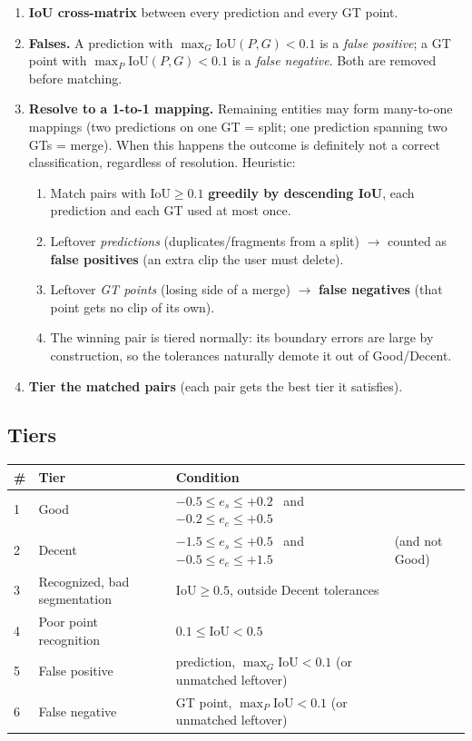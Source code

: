 \documentclass[11pt]{article}
\newcommand{\iou}{\mathrm{IoU}}
\begin{document}
\begin{enumerate}[nosep]
  \item \textbf{IoU cross-matrix} between every prediction and every GT point.
  \item \textbf{Falses.} A prediction with $\max_G \iou(P,G) < 0.1$ is a
        \emph{false positive}; a GT point with $\max_P \iou(P,G) < 0.1$ is a
        \emph{false negative}. Both are removed before matching.
  \item \textbf{Resolve to a 1-to-1 mapping.} Remaining entities may form many-to-one
        mappings (two predictions on one GT = split; one prediction spanning two GTs =
        merge). When this happens the outcome is definitely not a correct
        classification, regardless of resolution. Heuristic:
        \begin{enumerate}[nosep]
          \item Match pairs with $\iou \ge 0.1$ \textbf{greedily by descending IoU},
                each prediction and each GT used at most once.
          \item Leftover \emph{predictions} (duplicates/fragments from a split)
                $\rightarrow$ counted as \textbf{false positives} (an extra clip the
                user must delete).
          \item Leftover \emph{GT points} (losing side of a merge) $\rightarrow$
                \textbf{false negatives} (that point gets no clip of its own).
          \item The winning pair is tiered normally: its boundary errors are large by
                construction, so the tolerances naturally demote it out of Good/Decent.
        \end{enumerate}
  \item \textbf{Tier the matched pairs} (each pair gets the best tier it satisfies).
\end{enumerate}

\subsection{Tiers}

\begin{center}
\begin{tabular}{llll}
\toprule
\# & Tier & Condition & \\
\midrule
1 & Good & $-0.5 \le e_s \le +0.2$ \ and \ $-0.2 \le e_e \le +0.5$ & \\
2 & Decent & $-1.5 \le e_s \le +0.5$ \ and \ $-0.5 \le e_e \le +1.5$ & (and not Good) \\
3 & Recognized, bad segmentation & $\iou \ge 0.5$, outside Decent tolerances & \\
4 & Poor point recognition & $0.1 \le \iou < 0.5$ & \\
5 & False positive & prediction, $\max_G \iou < 0.1$ (or unmatched leftover) & \\
6 & False negative & GT point, $\max_P \iou < 0.1$ (or unmatched leftover) & \\
\bottomrule
\end{tabular}
\end{center}
\end{document}
